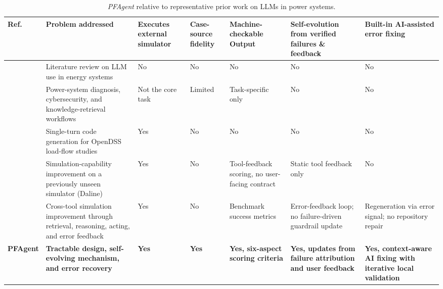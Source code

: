 \documentclass[journal]{IEEEtran}
\begin{document}
\begin{table}[!t]
\caption{\emph{PFAgent} relative to representative prior work on
LLMs in power systems.}
\label{tab:related_positioning}
\centering
\footnotesize
\setlength{\tabcolsep}{3pt}
\renewcommand{\arraystretch}{1.15}
\begin{tabular}{C{0.08\textwidth} L{0.23\textwidth} C{0.09\textwidth} C{0.10\textwidth} C{0.13\textwidth} C{0.14\textwidth} C{0.16\textwidth}}
\toprule
\textbf{Ref.} &
\textbf{Problem addressed} &
\textbf{Executes external simulator} &
\textbf{Case-source fidelity} &
\textbf{Machine-checkable Output} &
\textbf{Self-evolution from verified failures \& feedback} &
\textbf{Built-in AI-assisted error fixing} \\
\midrule
\cite{majumder2024exploring,huang2024large} &
Literature review on LLM use in energy systems &
No & No & No & No & No \\
\cite{jing2024fault,zaboli2024chatgpt,wang2024carbon} &
Power-system diagnosis, cybersecurity, and knowledge-retrieval workflows &
Not the core task & Limited & Task-specific only & No & No \\
\cite{bonadia2023potential} &
Single-turn code generation for OpenDSS load-flow studies &
Yes & No & No & No & No \\
\cite{jia2024daline} &
Simulation-capability improvement on a previously unseen simulator (Daline) &
Yes & No & Tool-feedback scoring, no user-facing contract & Static tool feedback only & No \\
\cite{jia2025enhancing} &
Cross-tool simulation improvement through retrieval, reasoning, acting, and error feedback &
Yes & No & Benchmark success metrics &
Error-feedback loop; no failure-driven guardrail update &
Regeneration via error signal; no repository repair \\
\textbf{PFAgent} &
\textbf{Tractable design, self-evolving mechanism, and error recovery} &
\textbf{Yes} & \textbf{Yes} & \textbf{Yes, six-aspect scoring criteria} &
\textbf{Yes, updates from failure attribution and user feedback} &
\textbf{Yes, context-aware AI fixing with iterative local validation} \\
\bottomrule
\end{tabular}
\end{table}
\end{document}
